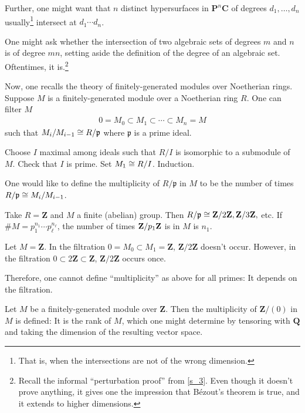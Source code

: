 \documentclass [11 pt, oneside, margin = 1 in] {article}
\begin{document}
Further, one might want that $n$ distinct hypersurfaces in $\mathbf{P}^n\mathbf{C}$ of degrees $d_1,\hdots, d_n$ usually\footnote{That is, when the intersections are not of the wrong dimension.} intersect at $d_1\cdots d_n$.

One might ask whether the intersection of two algebraic sets of degrees $m$ and $n$ is of degree $mn$, setting aside the definition of the degree of an algebraic set. Oftentimes, it is.\footnote{Recall the informal ``perturbation proof'' from \cref{s_3}. Even though it doesn't prove anything, it gives one the impression that B\'ezout's theorem is true, and it extends to higher dimensions.} 

Now, one recalls the theory of finitely-generated modules over Noetherian rings. Suppose $M$ is a finitely-generated module over a Noetherian ring $R$. One can filter $M$
\begin{align*}
	0=M_0 \subset M_1\subset \cdots\subset M_n=M
\end{align*}
such that $M_i/M_{i-1} \cong R/\mathfrak{p}$ where $\mathfrak{p}$ is a prime ideal.
\begin{esquisse}
	Choose $I$ maximal among ideals such that $R/I$ is isomorphic to a submodule of $M$. Check that $I$ is prime. Set $M_1\cong R/I$. Induction.
\end{esquisse}

One would like to define the multiplicity of $R/\mathfrak{p}$ in $M$ to be the number of times $R/\mathfrak{p}\cong M_i/M_{i-1}$.

\begin{example}[ ]\label{}\text{}
Take $R=\mathbf{Z}$ and $M$ a finite (abelian) group. Then $R/\mathfrak{p} \cong \mathbf Z/2\mathbf Z,\mathbf Z/3\mathbf Z,$ etc. If $\# M = p_1^{n_1}\cdots p_\ell^{n_\ell}$, the number of times $\mathbf Z/p_1\mathbf Z$ is in $M$ is $n_1$. 
\end{example}

\begin{example}[ ]\label{fail_1}\text{}
Let $M=\mathbf{Z}$. In the filtration $0=M_0\subset M_1=\mathbf{Z}$, $\mathbf{Z}/2\mathbf{Z}$ doesn't occur. However, in the filtration $0\subset 2\mathbf{Z}\subset \mathbf{Z}$, $\mathbf{Z}/2\mathbf{Z}$ occurs once.
\end{example}

\begin{remark}
	Therefore, one cannot define ``multiplicity'' as above for all primes: It depends on the filtration.
\end{remark}

\begin{example}[ ]\label{}\text{}
Let $M$ be a finitely-generated module over $\mathbf{Z}$. Then the multiplicity of $\mathbf{Z}/(0)$ in $M$ is defined: It is the rank of $M$, which one might determine by tensoring with $\mathbf{Q}$ and taking the dimension of the resulting vector space.
\end{example}
\end{document}
